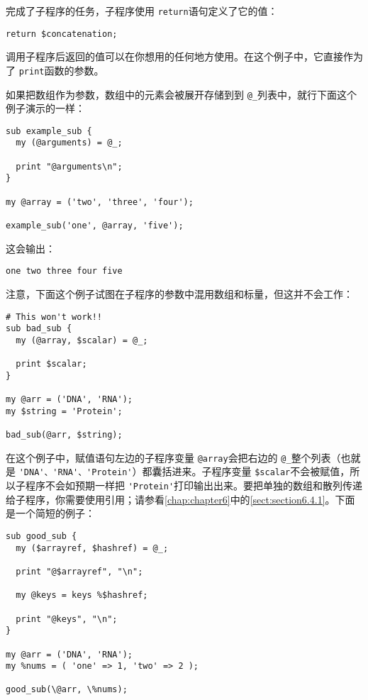 完成了子程序的任务，子程序使用 \verb|return|语句定义了它的值：

\begin{lstlisting}
return $concatenation;
\end{lstlisting}

调用子程序后返回的值可以在你想用的任何地方使用。在这个例子中，它直接作为了 \verb|print|函数的参数。

如果把数组作为参数，数组中的元素会被展开存储到到 \verb|@_|列表中，就行下面这个例子演示的一样：

\begin{lstlisting}
sub example_sub {
  my (@arguments) = @_;

  print "@arguments\n";
}

my @array = ('two', 'three', 'four');

example_sub('one', @array, 'five');
\end{lstlisting}

这会输出：
 
\begin{lstlisting}
one two three four five
\end{lstlisting}

注意，下面这个例子试图在子程序的参数中混用数组和标量，但这并不会工作：

\begin{lstlisting}
# This won't work!!
sub bad_sub {
  my (@array, $scalar) = @_;

  print $scalar;
}

my @arr = ('DNA', 'RNA');
my $string = 'Protein';

bad_sub(@arr, $string);
\end{lstlisting}

在这个例子中，赋值语句左边的子程序变量 \verb|@array|会把右边的 \verb|@_|整个列表（也就是 \verb|'DNA'、'RNA'、'Protein'|）都囊括进来。子程序变量 \verb|$scalar|不会被赋值，所以子程序不会如预期一样把 \verb|'Protein'|打印输出出来。要把单独的数组和散列传递给子程序，你需要使用引用；请参看\autoref{chap:chapter6}中的\autoref{sect:section6.4.1}。下面是一个简短的例子：

\begin{lstlisting}
sub good_sub {
  my ($arrayref, $hashref) = @_;

  print "@$arrayref", "\n";

  my @keys = keys %$hashref;

  print "@keys", "\n";
}

my @arr = ('DNA', 'RNA');
my %nums = ( 'one' => 1, 'two' => 2 );

good_sub(\@arr, \%nums);
\end{lstlisting}

